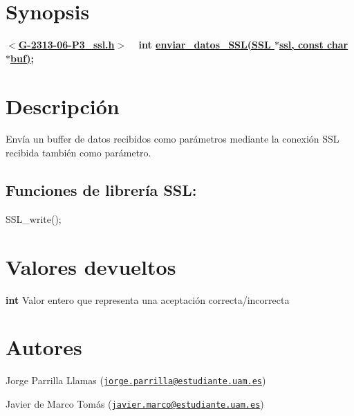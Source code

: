 \hypertarget{enviar_datos_SSL_synopsis_4}{}\section{Synopsis}\label{enviar_datos_SSL_synopsis_4}
{ {\bfseries $<$\hyperlink{G-2313-06-P3__ssl_8h}{G-\/2313-\/06-\/\+P3\+\_\+ssl.\+h}$>$} ~\newline
 {\bfseries int \hyperlink{G-2313-06-P3__ssl_8c_adf9cb4f6b9c27081fcf12a942db1b288}{enviar\+\_\+datos\+\_\+\+S\+S\+L(\+S\+S\+L $\ast$ssl, const char $\ast$buf)};} } \hypertarget{enviar_datos_SSL_descripcion_4}{}\section{Descripción}\label{enviar_datos_SSL_descripcion_4}
Envía un buffer de datos recibidos como parámetros mediante la conexión S\+SL recibida también como parámetro. ~\newline
\subsection*{{\bfseries Funciones de librería S\+SL\+:}}


\begin{DoxyItemize}
\item S\+S\+L\+\_\+write(); 
\end{DoxyItemize}\hypertarget{enviar_datos_SSL_return_4}{}\section{Valores devueltos}\label{enviar_datos_SSL_return_4}

\begin{DoxyItemize}
\item {\bfseries int} Valor entero que representa una aceptación correcta/incorrecta 
\end{DoxyItemize}\hypertarget{enviar_datos_SSL_authors_4}{}\section{Autores}\label{enviar_datos_SSL_authors_4}

\begin{DoxyItemize}
\item Jorge Parrilla Llamas (\href{mailto:jorge.parrilla@estudiante.uam.es}{\tt jorge.\+parrilla@estudiante.\+uam.\+es}) 
\item Javier de Marco Tomás (\href{mailto:javier.marco@estudiante.uam.es}{\tt javier.\+marco@estudiante.\+uam.\+es}) 
\end{DoxyItemize}